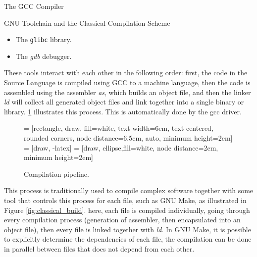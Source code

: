 \begin{section}{The GCC Compiler}
\begin{subsection}{GNU Toolchain and the Classical Compilation Scheme}
\begin{itemize}
    \item The \texttt{glibc} library.

    \item The \textit{gdb} debugger.
\end{itemize}

These tools interact with each other in the following order: first, the code in the Source
Language is compiled using GCC to a machine language, then the code is assembled using the
assembler \textit{as}, which builds an object file, and then the linker \textit{ld} will
collect all generated object files and link together
into a single binary or library. \ref{fig:gnu_toolchain} illustrates this process.
This is automatically done by the gcc driver.

\begin{figure}
 = [rectangle, draw, fill=white,
    text width=6em, text centered, rounded corners, node distance=6.5cm, auto, minimum height=2em]
 = [draw, -latex]
 = [draw, ellipse,fill=white, node distance=2cm,
    minimum height=2em]
\begin{center}
\end{center}
\caption{Compilation pipeline.}
\label{fig:gnu_toolchain}
\end{figure}

This process is traditionally used to compile complex software together with some
tool that controls this process for each file, such as GNU Make, as illustrated in
Figure \ref{fig:classical_build}. here, each file is compiled individually, going
through every compilation process (generation of assembler, then encapsulated into
an object file), then every file is linked together with \textit{ld}. In GNU Make,
it is possible to explicitly determine the dependencies of each file, the compilation
can be done in parallel between files that does not depend from each other.


\end{subsection}
\end{section}
